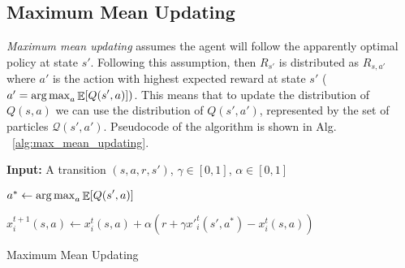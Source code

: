 \subsection{Maximum Mean Updating}
\emph{Maximum mean updating} assumes the agent will follow the apparently optimal policy at state $s'$. Following this assumption, then $R_{s'}$ is distributed as $R_{s,a'}$ where $a'$ is the action with highest expected reward at state $s'$ ($a'=\operatorname*{arg\,max}_{a} \displaystyle \mathop{\mathbb{E}}[Q(s',a)])$. This means that to update the distribution of $Q(s,a)$ we can use the distribution of $Q(s',a')$, represented by the set of particles $\mathcal{Q}(s',a')$. Pseudocode of the algorithm is shown in Alg. ~\ref{alg:max_mean_updating}. 
\begin{algorithm}[H]
\begin{flushleft}
 \textbf{Input:} A transition $(s,a,r,s')$, $\gamma \in [0,1]$, $\alpha \in [0,1]$\\
\end{flushleft}
 \begin{algorithmic}
 \State $a^* \leftarrow \operatorname*{arg\,max}_a \displaystyle \mathop{\mathbb{E}}[Q(s',a)]$
 
 		\State $x^{t+1}_i(s,a) \leftarrow x^{t}_i(s,a) + \alpha (r+\gamma x'^{t}_i(s',a^*) - x^{t}_i(s,a))$
 \EndFor
 \end{algorithmic}
 \caption{Maximum Mean Updating}
 \label{alg:max_mean_updating}
\end{algorithm}  
